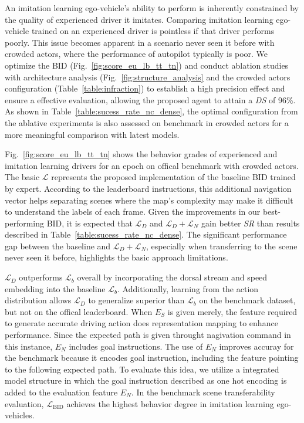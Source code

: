 \hspace{1pc}An imitation learning ego-vehicle's ability to perform is inherently constrained by the quality of experienced driver it imitates. 
Comparing imitation learning ego-vehicle trained on an experienced driver is pointless if that driver performs poorly.
This issue becomes apparent in a scenario never seen it before with crowded actors, where the performance of autopilot typically is poor. 
We optimize the BID (Fig.~\ref{fig:score_eu_lb_tt_tn}) and conduct ablation studies with architecture analysis (Fig.~\ref{fig:structure_analysis} and the crowded actors configuration (Table~\ref{table:infraction}) to establish a high precision effect and ensure a effective evaluation, allowing the proposed agent to attain a \emph{DS} of 96\%. 
As shown in Table~\ref{table:sucess_rate_nc_dense}, the optimal configuration from the ablative experiments is also assessed on benchmark in crowded actors for a more meaningful comparison with latest models.


Fig.~\ref{fig:score_eu_lb_tt_tn} shows the behavior grades of experienced and imitation learning drivers for an epoch on offical benchmark with crowded actors.
The basic $\mathcal{L}$ represents the proposed implementation of the baseline BID trained by expert. 
According to the leaderboard instructions, this additional navigation vector helps separating scenes where the map's complexity may make it difficult to understand the labels of each frame.
Given the improvements in our best-performing BID, it is expected that $\mathcal{L}_D$ and $\mathcal{L}_D + \mathcal{L}_N$ gain better \emph{SR} than results described in Table~\ref{table:sucess_rate_nc_dense}.
The significant performance gap between the baseline and $\mathcal{L}_D + \mathcal{L}_N$, especially when transferring to the scene never seen it before, highlights the basic approach limitations.


$\mathcal{L}_D$ outperforms $\mathcal{L}_b$ overall by incorporating the dorsal stream and speed embedding into the baseline $\mathcal{L}_b$.
Additionally, learning from the action distribution allows $\mathcal{L}_D$ to generalize superior than $\mathcal{L}_b$ on the benchmark dataset, but not on the offical leaderboard.
When $E_S$ is given merely, the feature required to generate accurate driving action does representation mapping to enhance performance.
Since the expected path is given throught nagivation command in this instance, $E_N$ includes goal instructions.
The use of $E_N$ improves accuray for the benchmark because it encodes goal instruction, including the feature pointing to the following expected path.
To evaluate this idea, we utilize a integrated model structure in which the goal instruction described as one hot encoding is added to the evaluation feature $E_N$.
In the benchmark scene transferability evaluation, $\mathcal{L}_\text{BID}$ achieves the highest behavior degree in imitation learning ego-vehicles.



